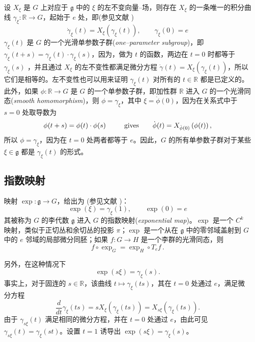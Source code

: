 \documentclass[11pt,fontset=founder]{ctexart}
\begin{document}
设 $X_{\xi }$ 是 $G$ 上对应于 $\mathfrak{g}$ 中的 $\xi $ 的左不变向量–场，则存在 $X_{\xi }$ 的一条唯一的积分曲线 $\gamma _{\xi}:\mathbb{R}\rightarrow G$，起始于 $e$ 处，即(参见文献 \cite{GaneshSprBig,GaneshADG})
\begin{equation*}
\dot{\gamma}_{\xi }(t)=X_{\xi }\left( \gamma _{\xi }(t)\right) ,\qquad
\gamma _{\xi }(0)=e
\end{equation*}
$\gamma _{\xi }(t)$ 是 $G$ 的一个光滑单参数子群(\emph{one--parameter subgroup})，即$\gamma _{\xi }(t+s)=\gamma _{\xi }(t)\cdot \gamma _{\xi }(s)$，因为，做为 $t$ 的函数，两边在 $t=0$ 时都等于 $\gamma _{\xi }(s)$ ，并且通过 $X_{\xi }$ 的左不变性都满足微分方程 $\dot{\gamma}(t)=X_{\xi }\left( \gamma _{\xi}(t)\right) $，所以它们是相等的。左不变性也可以用来证明 $\gamma _{\xi }(t)$ 对所有的 $t\in \mathbb{R}$ 都是已定义的。此外，如果 $\phi :\mathbb{R}\rightarrow G$ 是 $G$ 的一个单参数子群，即加性群 $\mathbb{R}$ 进入 $G$ 的一个光滑同态(\emph{smooth homomorphism})，则 $\phi =\gamma _{\xi }$，其中 $\xi =\dot{\phi}(0)$，因为在关系式中于 $s=0$ 处取导数为
\begin{equation*}
\phi (t+s)=\phi (t)\cdot \phi (s)\qquad \text{gives\qquad }\dot{\phi}(t)=X_{%
\dot{\phi}(0)}\left( \phi (t)\right) ,
\end{equation*}%
所以 $\phi =\gamma _{\xi }$，因为在 $t=0$ 处两者都等于 $e$。因此，$G$ 的所有单参数子群对于某些 $\xi \in \mathfrak{g}$ 都是 $\gamma _{\xi }(t)$ 的形式。

\subsection{指数映射}

映射 $\exp :\mathfrak{g}\rightarrow G$，给出为 (参见文献 \cite{Abraham,GaneshSprBig,GaneshADG})：
\begin{equation*}
\exp (\xi )=\gamma _{\xi }(1),\qquad \exp (0) = e
\end{equation*}
其被称为 $G$ 的李代数 $\mathfrak{g}$ 进入 $G$ 的指数映射(\textit{exponential map})。$\exp $ 是一个 $C^{k}$ 映射，类似于正切丛和余切丛的投影 $\pi$；$\exp $ 是一个从在 $\mathfrak{g}$ 中的零邻域盖射到 $G$ 中的 $e$ 邻域的局部微分同胚；如果 $f:G\rightarrow H$ 是一个李群的光滑同态，则
\begin{equation*}
f\circ \exp _{G}=\exp _{H}\circ T_{e}f\,.
\end{equation*}

另外，在这种情况下
\begin{equation*}
\exp (s\xi )=\gamma _{\xi }(s).
\end{equation*}%
事实上，对于固连的 $s\in \mathbb{R}$，该曲线 $t\mapsto \gamma _{\xi }(ts)$，其在 $t=0$ 处通过 $e$，满足微分方程
\begin{equation*}
\frac{d}{dt}\gamma _{\xi }(ts)=sX_{\xi }\left( \gamma _{\xi }(ts)\right)
=X_{s\xi }\left( \gamma _{\xi }(ts)\right) .
\end{equation*}
由于 $\gamma _{s\xi }(t)$ 满足相同的微分方程，并在 $t=0$ 处通过 $e$，由此可见 $\gamma _{s\xi }(t)=\gamma _{\xi }(st)$。设置 $t=1$ 诱导出 $\exp (s\xi )=\gamma _{\xi }(s)$。
\end{document}
